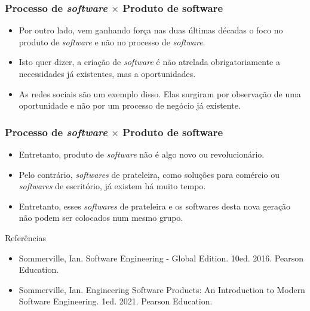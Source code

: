 \documentclass[11pt]{beamer}
\begin{document}
    \begin{frame}
      \frametitle{Processo de \textit{software} $\times$ Produto de software}
      \begin{itemize}
        \item Por outro lado, vem ganhando força nas duas últimas décadas o foco no produto de \textit{software} e não no processo de \textit{software}.
        \item Isto quer dizer, a criação de \textit{software} é não atrelada obrigatoriamente a necessidades já existentes, mas a oportunidades.
        \item As redes sociais são um exemplo disso. Elas surgiram por observação de uma oportunidade e não por um processo de negócio já existente.
      \end{itemize}
    \end{frame}

    \begin{frame}
      \frametitle{Processo de \textit{software} $\times$ Produto de software}
      \begin{itemize}
        \item Entretanto, produto de \textit{software} não é algo novo ou revolucionário.
        \item Pelo contrário, \textit{softwares} de prateleira, como soluções para comércio ou \textit{softwares} de escritório, já existem há muito tempo.
        \item Entretanto, esses \textit{softwares} de prateleira e os softwares desta nova geração não podem ser colocados num mesmo grupo.
      \end{itemize}
    \end{frame}

    \begin{frame}{Referências}
      \begin{itemize}
          \item Sommerville, Ian. Software Engineering - Global Edition. 10ed. 2016. Pearson Education.
          \item Sommerville, Ian. Engineering Software Products: An Introduction to Modern Software Engineering. 1ed. 2021. Pearson Education. 
      \end{itemize}
    \end{frame}
\end{document}
